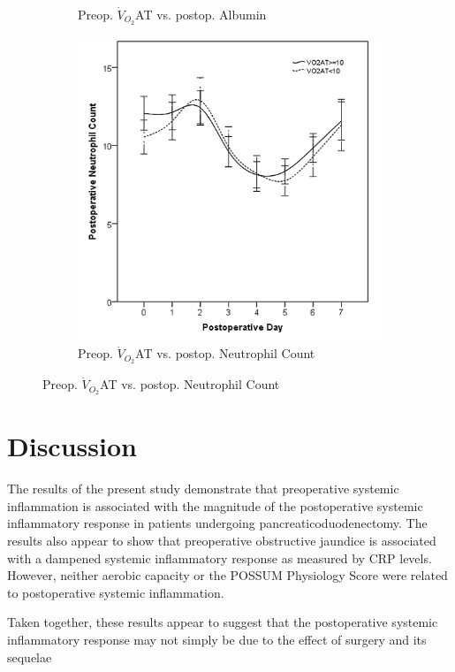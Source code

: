 \begin{figure}[p]
\begin{subfigure}{0.48\textwidth}
		\caption{Preop. $\dot{V}_{O_2}$AT vs. postop. Albumin}
		\label{fig:sirs_at_alb}
	\end{subfigure}
	
	\vspace{1cm}
		

	\begin{subfigure}{0.48\textwidth}
		\centering
		\includegraphics[width=\textwidth]{Figures/sirs_at_neut}
		\caption{Preop. $\dot{V}_{O_2}$AT vs. postop. Neutrophil Count}
		\label{fig:sirs_at_neut}
	\end{subfigure}	
\end{figure}


\section{Discussion}

The results of the present study demonstrate that preoperative systemic inflammation is associated with the magnitude of the postoperative systemic inflammatory response  in patients undergoing pancreaticoduodenectomy. The results also appear to show that preoperative obstructive jaundice is associated with a dampened systemic inflammatory response as measured by CRP levels. However, neither aerobic capacity or the POSSUM Physiology Score were related to postoperative systemic inflammation. 

Taken together, these results appear to suggest that the postoperative systemic inflammatory response may not simply be due to the effect of surgery and its sequelae 





























